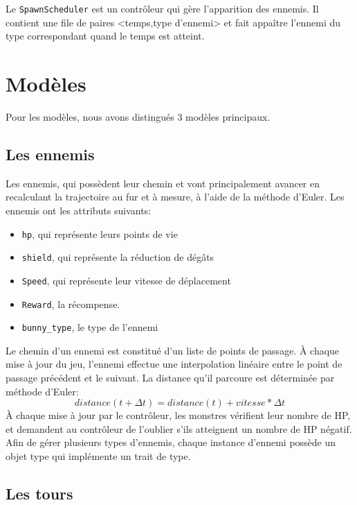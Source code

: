 \documentclass[a4paper,11pt]{article}
\begin{document}
\noindent Le \texttt{SpawnScheduler} est un contr\^oleur qui g\`ere
l'apparition des ennemis. Il contient une file de paires
<temps,type d'ennemi> et fait appa\^itre l'ennemi du type correspondant quand
le temps est atteint.


\section{Modèles} \label{models}

Pour les modèles, nous avons distingués 3 modèles principaux.

\subsection{Les ennemis}
Les ennemis, qui possèdent leur chemin et vont principalement avancer en
recalculant la trajectoire au fur et à mesure, à l'aide de la méthode d'Euler.
Les ennemis ont les attributs suivants:
\begin{itemize}
    \item \texttt{hp}, qui représente leurs points de vie
    \item \texttt{shield}, qui représente la réduction de dégâts
    \item \texttt{Speed}, qui représente leur vitesse de déplacement
    \item \texttt{Reward}, la récompense.
    \item \texttt{bunny\_type}, le type de l'ennemi
\end{itemize}

Le chemin d'un ennemi est constitu\'e d'un liste de points de passage.
\`A chaque mise \`a jour du jeu, l'ennemi effectue une interpolation lin\'eaire
entre le point de passage pr\'ec\'edent et le suivant. La distance qu'il
parcoure est d\'etermin\'ee par m\'ethode d'Euler:
$$ distance(t+\Delta t) = distance(t) + vitesse * \Delta t $$
À chaque mise à jour par le contrôleur, les monstres vérifient leur nombre de HP,
et demandent au contrôleur de l'oublier s'ils atteignent un nombre de HP négatif. \\

\noindent Afin de g\'erer plusieurs types d'ennemis, chaque instance d'ennemi poss\`ede un
objet type qui impl\'emente un trait de type.

\subsection{Les tours}
\end{document}
